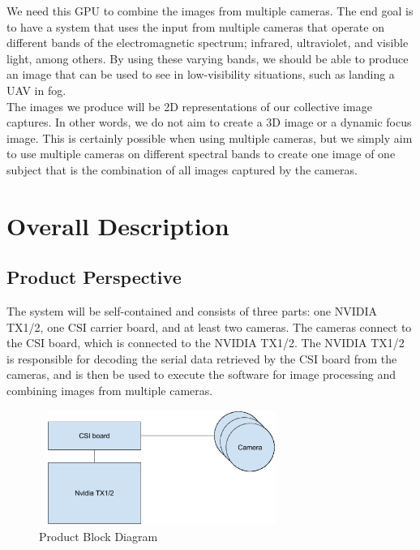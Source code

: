 \documentclass[letterpaper,10pt,serif,draftclsnofoot,onecolumn,compsoc,titlepage]{IEEEtran}
\begin{document}
We need this GPU to combine the images from multiple cameras. The end goal is to have 
a system that uses the input from multiple cameras that operate on different bands of 
the electromagnetic spectrum; infrared, ultraviolet, and visible light, among others. 
 By using these varying bands, we should be able to produce an image that can be used 
 to see in low-visibility situations, such as landing a UAV in fog.\\

The images we produce will be 2D representations of our collective image captures. In 
other words, we do not aim to create a 3D image or a dynamic focus image. This is 
certainly possible when using multiple cameras, but we simply aim to use multiple 
cameras on different spectral bands to create one image of one subject that is the 
combination of all images captured by the cameras.\\


\section{Overall Description}

\subsection{Product Perspective}

The system will be self-contained and consists of three parts: one NVIDIA TX1/2, 
one CSI carrier board, and at least two cameras. The cameras connect to the CSI board, 
which is connected to the NVIDIA TX1/2. The NVIDIA TX1/2 is responsible for decoding 
the serial data retrieved by the CSI board from the cameras, and is then be used to 
execute the software for image processing and combining images from multiple cameras.\\

\begin{figure}[H]
	\centering
	\label{fig:CopyOnWriteBefore}
	\includegraphics[width=8cm,height=3.75cm]{images/block_diagram.eps}
	\caption{Product Block Diagram \label{overflow}}
\end{figure}
\end{document}
